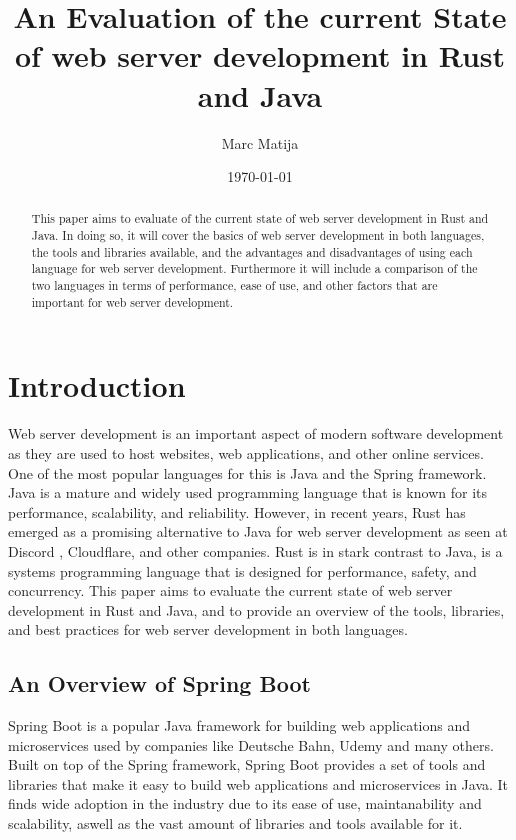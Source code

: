 \documentclass[a4paper,12pt]{article}
\title{An Evaluation of the current State of web server development in Rust and Java}
\author{Marc Matija}
\date{\today}
\begin{document}
	\maketitle
	\vspace{2cm}
	\begin{abstract}
		This paper aims to evaluate of the current state of web server development in Rust and Java. 
		In doing so, it will cover the basics of web server development in both languages, the tools and libraries 
		available, and the advantages and disadvantages of using each language for web server development. 
		Furthermore it will include a comparison of the two languages in terms of performance, ease of 
		use, and other factors that are important for web server development.
	\end{abstract}
	
	\newpage
	\tableofcontents
	\newpage
	
	\section{Introduction}
	\label{sec:introduction}
	Web server development is an important aspect of modern software development as they are 
	used to host websites, web applications, and other online services.
	One of the most popular languages for this is Java and the Spring framework.
	Java is a mature and widely used programming language that is known for its performance, scalability, and reliability.
	However, in recent years, Rust has emerged as a promising alternative to Java for web server development as seen at Discord 
	\cite{Discord}, Cloudflare\cite{Cloudflare_Pingora}, and other companies. 
	Rust is in stark contrast to Java, is a systems programming language that is designed for performance, safety, and concurrency.
	This paper aims to evaluate the current state of web server development in Rust and Java, and to provide an overview of 
	the tools, libraries, and best practices for web server development in both languages.
	
	\subsection{An Overview of Spring Boot}
	\label{subsec:spring_boot}
	Spring Boot is a popular Java framework for building web applications and microservices used by companies like 
	Deutsche Bahn\cite{DB_Job_Description}, Udemy \cite{Techstack_Udemy} and many others\cite{Spring_Boot_stackshare}.
	Built on top of the Spring framework, Spring Boot provides a set of tools and libraries that make it easy to build
	web applications and microservices in Java. It finds wide adoption in the industry due to its ease of use, maintanability 
	and scalability, aswell as the vast amount of libraries and tools available for it.
\end{document}
